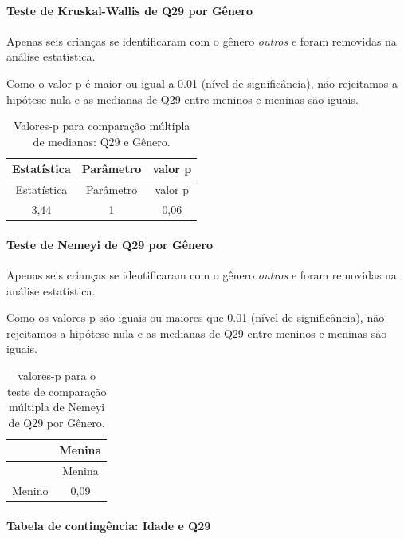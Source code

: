 \documentclass[]{article}
\let\oldparagraph\paragraph
\renewcommand{\paragraph}[1]{\oldparagraph{#1}\mbox{}}
\begin{document}
\hypertarget{teste-de-kruskal-wallis-de-q29-por-guxeanero}{%
\paragraph{Teste de Kruskal-Wallis de Q29 por Gênero}\label{teste-de-kruskal-wallis-de-q29-por-guxeanero}}

Apenas seis crianças se identificaram com o gênero \emph{outros} e foram removidas na análise estatística.

Como o valor-p é maior ou igual a 0.01 (nível de significância), não rejeitamos a hipótese nula e as medianas de Q29 entre meninos e meninas são iguais.

\begin{longtable}[]{@{}ccc@{}}
\caption{\label{tab:unnamed-chunk-914}Valores-p para comparação múltipla de medianas: Q29 e Gênero.}\tabularnewline
\toprule
Estatística & Parâmetro & valor p\tabularnewline
\midrule
\endfirsthead
\toprule
Estatística & Parâmetro & valor p\tabularnewline
\midrule
\endhead
3,44 & 1 & 0,06\tabularnewline
\bottomrule
\end{longtable}

\hypertarget{teste-de-nemeyi-de-q29-por-guxeanero}{%
\paragraph{Teste de Nemeyi de Q29 por Gênero}\label{teste-de-nemeyi-de-q29-por-guxeanero}}

Apenas seis crianças se identificaram com o gênero \emph{outros} e foram removidas na análise estatística.

Como os valores-p são iguais ou maiores que 0.01 (nível de significância), não rejeitamos a hipótese nula e as medianas de Q29 entre meninos e meninas são iguais.

\begin{longtable}[]{@{}lc@{}}
\caption{\label{tab:unnamed-chunk-916}valores-p para o teste de comparação múltipla de Nemeyi de Q29 por Gênero.}\tabularnewline
\toprule
& Menina\tabularnewline
\midrule
\endfirsthead
\toprule
& Menina\tabularnewline
\midrule
\endhead
Menino & 0,09\tabularnewline
\bottomrule
\end{longtable}

\cleardoublepage

\hypertarget{tabela-de-continguxeancia-idade-e-q29}{%
\paragraph{Tabela de contingência: Idade e Q29}\label{tabela-de-continguxeancia-idade-e-q29}}
\end{document}
